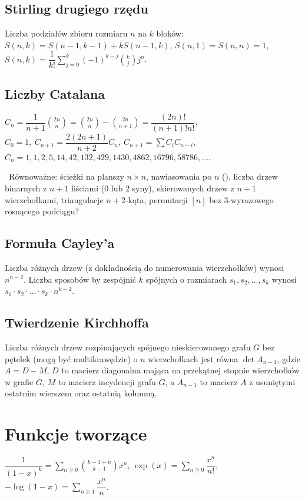 	\subsection{Stirling drugiego rzędu}
		Liczba podziałów zbioru rozmiaru $n$ na $k$ bloków:
		$S(n,k) = S(n-1,k-1) + k S(n-1,k)$,
		$S(n,1) = S(n,n) = 1$,
		$S(n,k) = \dfrac{1}{k!}\sum_{j=0}^k (-1)^{k-j}\binom{k}{j}j^n$.

	\subsection{Liczby Catalana}
		$ C_n=\dfrac{1}{n+1}\binom{2n}{n}= \binom{2n}{n}-\binom{2n}{n+1} = \dfrac{(2n)!}{(n+1)!n!} $,
		$ C_0=1,\ C_{n+1} = \dfrac{2(2n+1)}{n+2}C_n,\ C_{n+1}=\sum C_iC_{n-i} $,
		$C_n = 1, 1, 2, 5, 14, 42, 132, 429, 1430, 4862, 16796, 58786, \dots$.
		\par \ 
		Równoważne:
			ścieżki na planszy $n\times n$,
			nawiasowania po $n$ (),
			liczba drzew binarnych z $n+1$ liściami (0 lub 2 syny),
			skierowanych drzew z $n+1$ wierzchołkami,
			triangulacje $n+2$-kąta,
			permutacji $[n]$ bez 3-wyrazowego rosnącego podciągu?

	\subsection{Formuła Cayley'a}
		Liczba różnych drzew (z dokładnością do numerowania wierzchołków) wynosi $n^{n-2}$.
		Liczba sposobów by zespójnić $k$ spójnych o rozmiarach $s_1, s_2, \dots, s_k$ wynosi $s_1 \cdot s_2 \cdot \dots \cdot s_k \cdot n^{k-2}$.

	\subsection{Twierdzenie Kirchhoffa}
		Liczba różnych drzew rozpinających spójnego nieskierowanego grafu $G$ bez pętelek (mogą być multikrawędzie) o $n$ wierzchołkach jest równa $\det A_{n-1}$, gdzie $A = D - M$, $D$ to macierz diagonalna mająca na przekątnej stopnie wierzchołków w grafie $G$, $M$ to macierz incydencji grafu $G$, a $A_{n-1}$ to macierz $A$ z usuniętymi ostatnim wierszem oraz ostatnią kolumną.

		\vspace{2em}

\section{Funkcje tworzące}
		$ \dfrac{1}{\left(1-x\right)^k} = \sum_{n\geq 0} \binom{k - 1 + n}{k - 1} x ^ n $,
		$ \exp(x) = \sum_{n\geq 0} \dfrac{x^n}{n!} $,
		$ -\log(1 - x) = \sum_{n\geq 1} \dfrac{x^n}{n} $.

